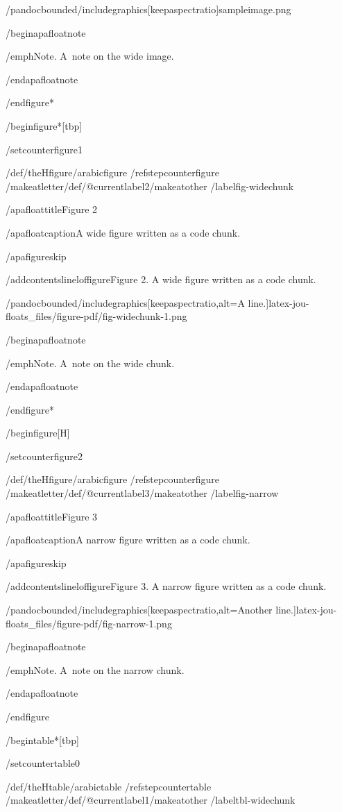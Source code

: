 /pandocbounded{/includegraphics[keepaspectratio]{sampleimage.png}}

/begin{apafloatnote}

/emph{Note}. A~note on the wide image.

/end{apafloatnote}

/end{figure*}

/begin{figure*}[tbp]

/setcounter{figure}{1}

/def/theHfigure{/arabic{figure}}%
/refstepcounter{figure}%
/makeatletter/def/@currentlabel{2}/makeatother%
/label{fig-widechunk}

/apafloattitle{Figure 2}

/apafloatcaption{A wide figure written as a code chunk.}

/apafigureskip

/addcontentsline{lof}{figure}{Figure 2. A wide figure written as a code
chunk.}

/pandocbounded{/includegraphics[keepaspectratio,alt={A line.}]{latex-jou-floats_files/figure-pdf/fig-widechunk-1.png}}

/begin{apafloatnote}

/emph{Note}. A~note on the wide chunk.

/end{apafloatnote}

/end{figure*}

/begin{figure}[H]

/setcounter{figure}{2}

/def/theHfigure{/arabic{figure}}%
/refstepcounter{figure}%
/makeatletter/def/@currentlabel{3}/makeatother%
/label{fig-narrow}

/apafloattitle{Figure 3}

/apafloatcaption{A narrow figure written as a code chunk.}

/apafigureskip

/addcontentsline{lof}{figure}{Figure 3. A narrow figure written as a
code chunk.}

/pandocbounded{/includegraphics[keepaspectratio,alt={Another line.}]{latex-jou-floats_files/figure-pdf/fig-narrow-1.png}}

/begin{apafloatnote}

/emph{Note}. A~note on the narrow chunk.

/end{apafloatnote}

/end{figure}

/begin{table*}[tbp]

/setcounter{table}{0}

/def/theHtable{/arabic{table}}%
/refstepcounter{table}%
/makeatletter/def/@currentlabel{1}/makeatother%
/label{tbl-widechunk}

